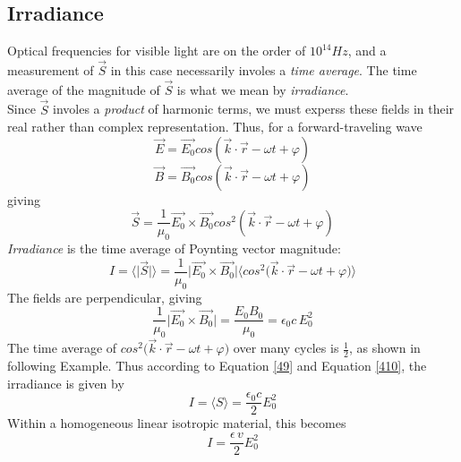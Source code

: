 \documentclass[12pt]{article}
\numberwithin{equation}{section}
\begin{document}
\subsection{Irradiance}
Optical frequencies for visible light are on the order of $10^{14}Hz$, and a measurement of $\vec{S}$ in this case necessarily involes a \emph{time average}. The time average of the magnitude of $\vec{S}$ is what we mean by \emph{irradiance}.\\
\indent Since $\vec{S}$ involes a \emph{product} of harmonic terms, we must experss these fields in their real rather than complex representation. Thus, for a forward-traveling wave
\[
    \vec{E}=\vec{E_0}cos(\vec{k}\cdot\vec{r}-\omega t+\varphi )
\]
\[
    \vec{B}=\vec{B_0}cos(\vec{k}\cdot\vec{r}-\omega t+\varphi)
\]
giving
\begin{equation}
    \vec{S}=\frac{1}{\mu_0}\vec{E_0}\times\vec{B_0}cos^2(\vec{k}\cdot\vec{r}-\omega t+\varphi)
\end{equation}
\emph{Irradiance} is the time average of Poynting vector magnitude:
\begin{equation}
    I=\bigg\langle  \bigg|\Vec{S}\bigg\vert \bigg\rangle=\frac{1}{\mu_0}\bigg|\vec{E_0}\times\vec{B_0}\bigg\vert\bigg\langle cos^2\bigg(\vec{k}\cdot\vec{r}-\omega t+\varphi\bigg)\bigg\rangle\label{49}
\end{equation}
The fields are perpendicular, giving
\begin{equation}
    \frac{1}{\mu_0}\bigg|\vec{E_0}\times\vec{B_0}\bigg\vert=\frac{E_0B_0}{\mu_0}=\epsilon_0c\,E_0^2\label{410}
\end{equation}
The time average of $cos^2\bigg(\vec{k}\cdot\vec{r}-\omega t+\varphi\bigg)$ over many cycles is $\frac{1}{2}$, as shown in  following Example. Thus according to Equation \eqref{49} and Equation \eqref{410}, the irradiance is given by
\begin{equation}
    I=\langle S \rangle=\frac{\epsilon_0c}{2}E_0^2
\end{equation}
Within a homogeneous linear isotropic material, this becomes
\begin{equation}
    I=\frac{\epsilon\,v}{2}E_0^2
\end{equation}
\end{document}
